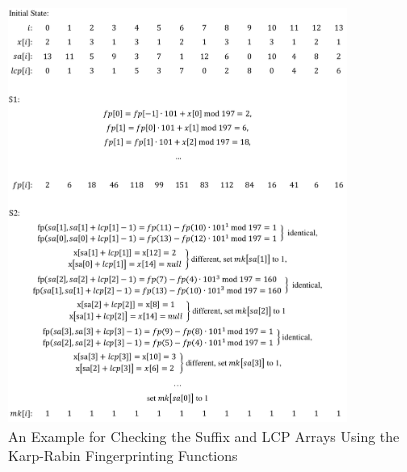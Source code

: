 \documentclass[10pt,journal,compsoc]{IEEEtran}
\begin{document}
\begin{figure}
	\centering
	\label{fig:example}
	\includegraphics[width = 0.8\textwidth]{example}
	\caption{An Example for Checking the Suffix and LCP Arrays Using the Karp-Rabin Fingerprinting Functions}	
\end{figure}

\end{document}
